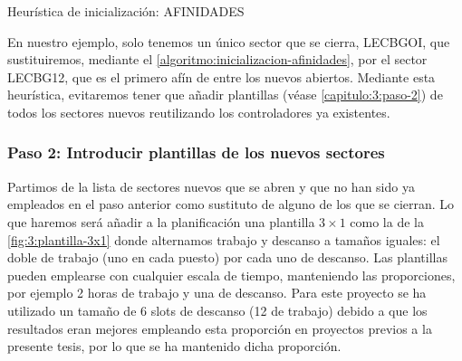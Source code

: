 \begin{algorithm}[H]
	\DontPrintSemicolon
	\medskip
	
	
	\caption{Heurística de inicialización: AFINIDADES}
	\label{algoritmo:inicializacion-afinidades}
\end{algorithm}


En nuestro ejemplo, solo tenemos un único sector que se cierra, LECBGOI, que sustituiremos, mediante el \autoref{algoritmo:inicializacion-afinidades}, por el sector LECBG12, que es el primero afín de entre los nuevos abiertos. Mediante esta heurística, evitaremos tener que añadir plantillas (véase \autoref{capitulo:3:paso-2}) de todos los sectores nuevos reutilizando los controladores ya existentes.

\subsubsection{Paso 2: Introducir plantillas de los nuevos sectores} \label{capitulo:3:paso-2}

Partimos de la lista de sectores nuevos que se abren y que no han sido ya empleados en el paso anterior como sustituto de alguno de los que se cierran. Lo que haremos será añadir a la planificación una plantilla $3\times1$ como la de la 
\autoref{fig:3:plantilla-3x1} donde alternamos trabajo y descanso a tamaños iguales: el doble de trabajo (uno en cada puesto) por cada uno de descanso. Las plantillas pueden emplearse con cualquier escala de tiempo, manteniendo las proporciones, por ejemplo 2 horas de trabajo y una de descanso.
Para este proyecto se ha utilizado un tamaño de 6 slots de descanso (12 de trabajo) debido a que los resultados eran mejores empleando esta proporción en proyectos previos a la presente tesis, por lo que se ha mantenido dicha proporción.

